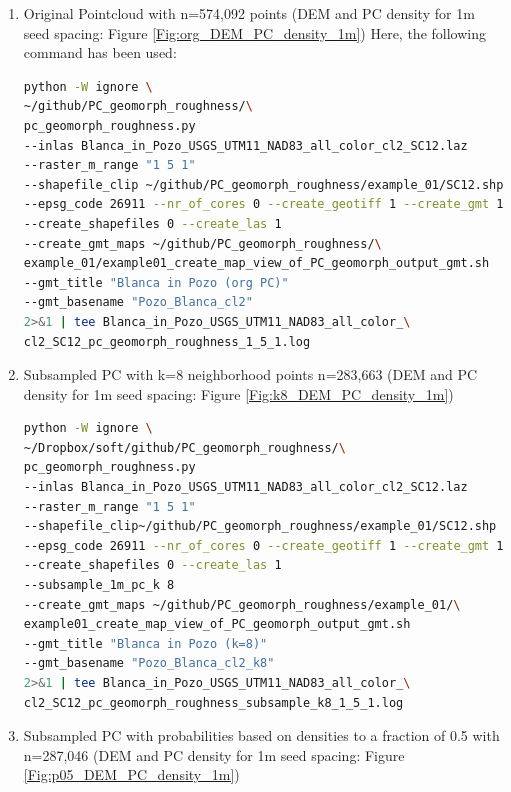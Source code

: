 \documentclass[a4paperpaper,,tablecaptionabove]{scrartcl}
\begin{document}
\begin{enumerate}
\def\labelenumi{\arabic{enumi}.}
\item
  Original Pointcloud with n=574,092 points (DEM and PC density for 1m
  seed spacing: Figure \ref{Fig:org_DEM_PC_density_1m}) Here, the
  following command has been used:

\begin{lstlisting}[language=bash]
python -W ignore \
~/github/PC_geomorph_roughness/\
pc_geomorph_roughness.py 
--inlas Blanca_in_Pozo_USGS_UTM11_NAD83_all_color_cl2_SC12.laz 
--raster_m_range "1 5 1" 
--shapefile_clip ~/github/PC_geomorph_roughness/example_01/SC12.shp 
--epsg_code 26911 --nr_of_cores 0 --create_geotiff 1 --create_gmt 1 
--create_shapefiles 0 --create_las 1 
--create_gmt_maps ~/github/PC_geomorph_roughness/\
example_01/example01_create_map_view_of_PC_geomorph_output_gmt.sh 
--gmt_title "Blanca in Pozo (org PC)" 
--gmt_basename "Pozo_Blanca_cl2" 
2>&1 | tee Blanca_in_Pozo_USGS_UTM11_NAD83_all_color_\
cl2_SC12_pc_geomorph_roughness_1_5_1.log
\end{lstlisting}
\item
  Subsampled PC with k=8 neighborhood points n=283,663 (DEM and PC
  density for 1m seed spacing: Figure \ref{Fig:k8_DEM_PC_density_1m})

\begin{lstlisting}[language=bash]
python -W ignore \
~/Dropbox/soft/github/PC_geomorph_roughness/\
pc_geomorph_roughness.py 
--inlas Blanca_in_Pozo_USGS_UTM11_NAD83_all_color_cl2_SC12.laz 
--raster_m_range "1 5 1" 
--shapefile_clip~/github/PC_geomorph_roughness/example_01/SC12.shp 
--epsg_code 26911 --nr_of_cores 0 --create_geotiff 1 --create_gmt 1 
--create_shapefiles 0 --create_las 1 
--subsample_1m_pc_k 8 
--create_gmt_maps ~/github/PC_geomorph_roughness/example_01/\
example01_create_map_view_of_PC_geomorph_output_gmt.sh 
--gmt_title "Blanca in Pozo (k=8)" 
--gmt_basename "Pozo_Blanca_cl2_k8" 
2>&1 | tee Blanca_in_Pozo_USGS_UTM11_NAD83_all_color_\
cl2_SC12_pc_geomorph_roughness_subsample_k8_1_5_1.log
\end{lstlisting}
\item
  Subsampled PC with probabilities based on densities to a fraction of
  0.5 with n=287,046 (DEM and PC density for 1m seed spacing: Figure
  \ref{Fig:p05_DEM_PC_density_1m})


\end{enumerate}
\end{document}
